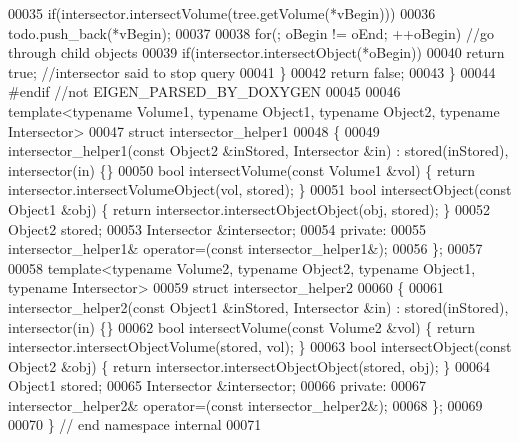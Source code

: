 \begin{DoxyCode}
00035       \textcolor{keywordflow}{if}(intersector.intersectVolume(tree.getVolume(*vBegin)))
00036         todo.push\_back(*vBegin);
00037 
00038     \textcolor{keywordflow}{for}(; oBegin != oEnd; ++oBegin) \textcolor{comment}{//go through child objects}
00039       \textcolor{keywordflow}{if}(intersector.intersectObject(*oBegin))
00040         \textcolor{keywordflow}{return} \textcolor{keyword}{true}; \textcolor{comment}{//intersector said to stop query}
00041   \}
00042   \textcolor{keywordflow}{return} \textcolor{keyword}{false};
00043 \}
00044 \textcolor{preprocessor}{#endif //not EIGEN\_PARSED\_BY\_DOXYGEN}
00045 
00046 \textcolor{keyword}{template}<\textcolor{keyword}{typename} Volume1, \textcolor{keyword}{typename} Object1, \textcolor{keyword}{typename} Object2, \textcolor{keyword}{typename} Intersector>
00047 \textcolor{keyword}{struct }intersector\_helper1
00048 \{
00049   intersector\_helper1(\textcolor{keyword}{const} Object2 &inStored, Intersector &in) : stored(inStored), intersector(in) \{\}
00050   \textcolor{keywordtype}{bool} intersectVolume(\textcolor{keyword}{const} Volume1 &vol) \{ \textcolor{keywordflow}{return} intersector.intersectVolumeObject(vol, stored); \}
00051   \textcolor{keywordtype}{bool} intersectObject(\textcolor{keyword}{const} Object1 &obj) \{ \textcolor{keywordflow}{return} intersector.intersectObjectObject(obj, stored); \}
00052   Object2 stored;
00053   Intersector &intersector;
00054 \textcolor{keyword}{private}:
00055   intersector\_helper1& operator=(\textcolor{keyword}{const} intersector\_helper1&);
00056 \};
00057 
00058 \textcolor{keyword}{template}<\textcolor{keyword}{typename} Volume2, \textcolor{keyword}{typename} Object2, \textcolor{keyword}{typename} Object1, \textcolor{keyword}{typename} Intersector>
00059 \textcolor{keyword}{struct }intersector\_helper2
00060 \{
00061   intersector\_helper2(\textcolor{keyword}{const} Object1 &inStored, Intersector &in) : stored(inStored), intersector(in) \{\}
00062   \textcolor{keywordtype}{bool} intersectVolume(\textcolor{keyword}{const} Volume2 &vol) \{ \textcolor{keywordflow}{return} intersector.intersectObjectVolume(stored, vol); \}
00063   \textcolor{keywordtype}{bool} intersectObject(\textcolor{keyword}{const} Object2 &obj) \{ \textcolor{keywordflow}{return} intersector.intersectObjectObject(stored, obj); \}
00064   Object1 stored;
00065   Intersector &intersector;
00066 \textcolor{keyword}{private}:
00067   intersector\_helper2& operator=(\textcolor{keyword}{const} intersector\_helper2&);
00068 \};
00069 
00070 \} \textcolor{comment}{// end namespace internal}
00071 

\end{DoxyCode}
